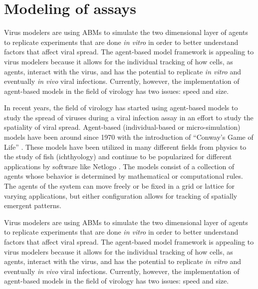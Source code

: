 \section{Modeling of assays}

Virus modelers are using ABMs to simulate the two dimensional layer of agents to replicate experiments that are done \emph{in vitro} in order to better understand factors that affect viral spread. The agent-based model framework is appealing to virus modelers because it allows for the individual tracking of how cells, as agents, interact with the virus, and has the potential to replicate \emph{in vitro} and eventually \emph{in vivo} viral infections. Currently, however, the implementation of agent-based models in the field of virology has two issues: speed and size. 


In recent years, the field of virology has started using agent-based models to study the spread of viruses during a viral infection assay \citep{beauchemin_simple_2005,alvarado_cellular-level_2018,wodarz_laws_2014,tong_development_2015,whitman20,goyal16,itakura10,wasik14} in an effort to study the spatiality of viral spread. Agent-based (individual-based or micro-simulation) models have been around since 1970 with the introduction of ``Conway's Game of Life'' \citep{gardner70}. These models have been utilized in many different fields from physics to the study of fish (ichthyology) \citep{owusu20} and continue to be popularized for different applications by software like Netlogo \citep{nogare20,chiacchio14}. The models consist of a collection of agents whose behavior is determined by mathematical or computational rules. The agents of the system can move freely \citep{beauchemin07} or be fixed in a grid or lattice \citep{beauchemin_simple_2005} for varying applications, but either configuration allows for tracking of spatially emergent patterns. 

Virus modelers are using ABMs to simulate the two dimensional layer of agents to replicate experiments that are done \emph{in vitro} in order to better understand factors that affect viral spread. The agent-based model framework is appealing to virus modelers because it allows for the individual tracking of how cells, as agents, interact with the virus, and has the potential to replicate \emph{in vitro} and eventually \emph{in vivo} viral infections. Currently, however, the implementation of agent-based models in the field of virology has two issues: speed and size. 

